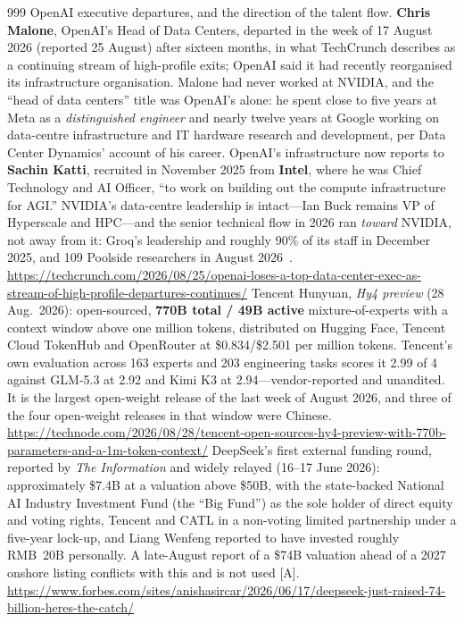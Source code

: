 \begin{thebibliography}{999}
 OpenAI executive departures, and the direction of the talent flow. \textbf{Chris Malone}, OpenAI's Head of Data Centers, departed in the week of 17 August 2026 (reported 25 August) after sixteen months, in what TechCrunch describes as a continuing stream of high-profile exits; OpenAI said it had recently reorganised its infrastructure organisation. Malone had never worked at NVIDIA, and the ``head of data centers'' title was OpenAI's alone: he spent close to five years at Meta as a \emph{distinguished engineer} and nearly twelve years at Google working on data-centre infrastructure and IT hardware research and development, per Data Center Dynamics' account of his career. OpenAI's infrastructure now reports to \textbf{Sachin Katti}, recruited in November 2025 from \textbf{Intel}, where he was Chief Technology and AI Officer, ``to work on building out the compute infrastructure for AGI.'' NVIDIA's data-centre leadership is intact---Ian Buck remains VP of Hyperscale and HPC---and the senior technical flow in 2026 ran \emph{toward} NVIDIA, not away from it: Groq's leadership and roughly 90\% of its staff in December 2025, and 109 Poolside researchers in August 2026~\cite{nvda-structured,nvda-poolside}. \url{https://techcrunch.com/2026/08/25/openai-loses-a-top-data-center-exec-as-stream-of-high-profile-departures-continues/}
 Tencent Hunyuan, \emph{Hy4 preview} (28 Aug.\ 2026): open-sourced, \textbf{770B total / 49B active} mixture-of-experts with a context window above one million tokens, distributed on Hugging Face, Tencent Cloud TokenHub and OpenRouter at \$0.834/\$2.501 per million tokens. Tencent's own evaluation across 163 experts and 203 engineering tasks scores it 2.99 of 4 against GLM-5.3 at 2.92 and Kimi K3 at 2.94---vendor-reported and unaudited. It is the largest open-weight release of the last week of August 2026, and three of the four open-weight releases in that window were Chinese. \url{https://technode.com/2026/08/28/tencent-open-sources-hy4-preview-with-770b-parameters-and-a-1m-token-context/}
 DeepSeek's first external funding round, reported by \emph{The Information} and widely relayed (16--17 June 2026): approximately \$7.4B at a valuation above \$50B, with the state-backed National AI Industry Investment Fund (the ``Big Fund'') as the sole holder of direct equity and voting rights, Tencent and CATL in a non-voting limited partnership under a five-year lock-up, and Liang Wenfeng reported to have invested roughly RMB~20B personally. A late-August report of a \$74B valuation ahead of a 2027 onshore listing conflicts with this and is not used [A]. \url{https://www.forbes.com/sites/anishasircar/2026/06/17/deepseek-just-raised-74-billion-heres-the-catch/}

\end{thebibliography}
